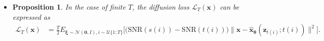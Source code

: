 \documentclass[10pt]{article}
\newtheorem{proposition}[lemma]{Proposition}
\newcommand{\ve}[1]{\mathbf{#1}}
\newcommand{\ves}[1]{\boldsymbol{#1}}
\newcommand{\mrm}[1]{\mathrm{#1}}
\newcommand{\mcal}[1]{\mathcal{#1}}
\newcommand{\SNR}{\mathrm{SNR}}
\begin{document}
\begin{itemize}
\begin{proof}
For $\sigma_Q^2(s,t)$, we have that
\begin{align*}
  \sigma_Q^2(s,t) 
  &= \frac{\sigma_{t|s}^2\sigma_s^2}{\sigma_t^2}
  = \frac{\sigma_s^2}{\sigma_t} \frac{\sigma_{t|s}^2}{\sigma_t}
  = \frac{\sigma_s^2}{\sigma_t} \big( -\sigma_t \mrm{expm1}(\gamma_{\ves{\eta}}(s) - \gamma_{\ves{\eta}}(t)) \big) \\
  &= -\sigma_s^2 \mrm{expm1}(\gamma_{\ves{\eta}}(s) - \gamma_{\ves{\eta}}(t))
\end{align*}
as required.
\end{proof}

\item \begin{proposition} \label{thm:diffusion-loss-snr-finite}
  In the case of finite $T$, the diffusion loss $\mcal{L}_T(\ve{x})$ can be expressed as
  \begin{align*}
    \mcal{L}_T(\ve{x})
    &= \frac{T}{2} E_{\ves{\xi} \sim \mcal{N}(\ves{0},I), i \sim \mcal{U}\{1:T\}} \Big[ \big(\SNR(s(i)) - \SNR(t(i))\big) \| \ve{x} - \hat{\ve{x}}_{\ves{\theta}}(\ve{z}_{t(i)}; t(i)) \|^2 \Big].
  \end{align*}
\end{proposition}


\end{itemize}
\end{document}
